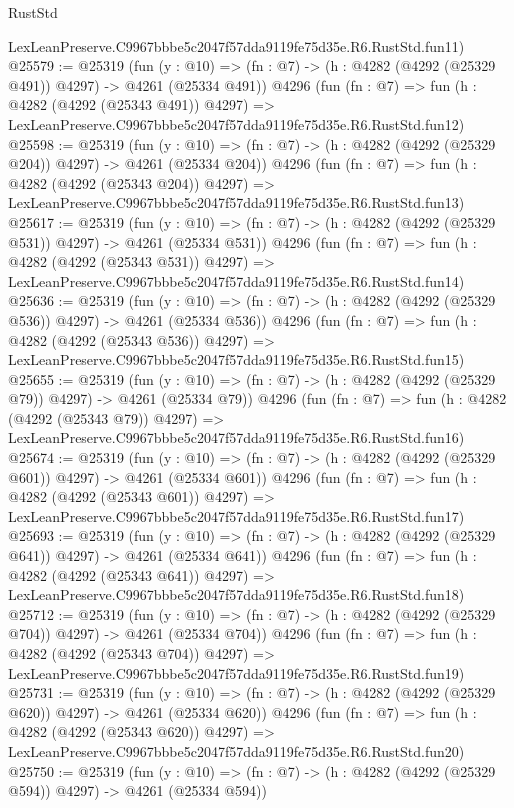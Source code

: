 \begin{lexlean}{RustStd}
\begin{coremodule}
    LexLeanPreserve.C9967bbbe5c2047f57dda9119fe75d35e.R6.RustStd.fun11)
@25579 := @25319
    (fun (y : @10) => (fn : @7) -> (h : @4282 (@4292 (@25329 @491)) @4297) -> @4261 (@25334 @491))
    @4296
    (fun (fn : @7) =>
    fun (h : @4282 (@4292 (@25343 @491)) @4297) =>
    LexLeanPreserve.C9967bbbe5c2047f57dda9119fe75d35e.R6.RustStd.fun12)
@25598 := @25319
    (fun (y : @10) => (fn : @7) -> (h : @4282 (@4292 (@25329 @204)) @4297) -> @4261 (@25334 @204))
    @4296
    (fun (fn : @7) =>
    fun (h : @4282 (@4292 (@25343 @204)) @4297) =>
    LexLeanPreserve.C9967bbbe5c2047f57dda9119fe75d35e.R6.RustStd.fun13)
@25617 := @25319
    (fun (y : @10) => (fn : @7) -> (h : @4282 (@4292 (@25329 @531)) @4297) -> @4261 (@25334 @531))
    @4296
    (fun (fn : @7) =>
    fun (h : @4282 (@4292 (@25343 @531)) @4297) =>
    LexLeanPreserve.C9967bbbe5c2047f57dda9119fe75d35e.R6.RustStd.fun14)
@25636 := @25319
    (fun (y : @10) => (fn : @7) -> (h : @4282 (@4292 (@25329 @536)) @4297) -> @4261 (@25334 @536))
    @4296
    (fun (fn : @7) =>
    fun (h : @4282 (@4292 (@25343 @536)) @4297) =>
    LexLeanPreserve.C9967bbbe5c2047f57dda9119fe75d35e.R6.RustStd.fun15)
@25655 := @25319
    (fun (y : @10) => (fn : @7) -> (h : @4282 (@4292 (@25329 @79)) @4297) -> @4261 (@25334 @79))
    @4296
    (fun (fn : @7) =>
    fun (h : @4282 (@4292 (@25343 @79)) @4297) =>
    LexLeanPreserve.C9967bbbe5c2047f57dda9119fe75d35e.R6.RustStd.fun16)
@25674 := @25319
    (fun (y : @10) => (fn : @7) -> (h : @4282 (@4292 (@25329 @601)) @4297) -> @4261 (@25334 @601))
    @4296
    (fun (fn : @7) =>
    fun (h : @4282 (@4292 (@25343 @601)) @4297) =>
    LexLeanPreserve.C9967bbbe5c2047f57dda9119fe75d35e.R6.RustStd.fun17)
@25693 := @25319
    (fun (y : @10) => (fn : @7) -> (h : @4282 (@4292 (@25329 @641)) @4297) -> @4261 (@25334 @641))
    @4296
    (fun (fn : @7) =>
    fun (h : @4282 (@4292 (@25343 @641)) @4297) =>
    LexLeanPreserve.C9967bbbe5c2047f57dda9119fe75d35e.R6.RustStd.fun18)
@25712 := @25319
    (fun (y : @10) => (fn : @7) -> (h : @4282 (@4292 (@25329 @704)) @4297) -> @4261 (@25334 @704))
    @4296
    (fun (fn : @7) =>
    fun (h : @4282 (@4292 (@25343 @704)) @4297) =>
    LexLeanPreserve.C9967bbbe5c2047f57dda9119fe75d35e.R6.RustStd.fun19)
@25731 := @25319
    (fun (y : @10) => (fn : @7) -> (h : @4282 (@4292 (@25329 @620)) @4297) -> @4261 (@25334 @620))
    @4296
    (fun (fn : @7) =>
    fun (h : @4282 (@4292 (@25343 @620)) @4297) =>
    LexLeanPreserve.C9967bbbe5c2047f57dda9119fe75d35e.R6.RustStd.fun20)
@25750 := @25319
    (fun (y : @10) => (fn : @7) -> (h : @4282 (@4292 (@25329 @594)) @4297) -> @4261 (@25334 @594))

\end{coremodule}
\end{lexlean}

